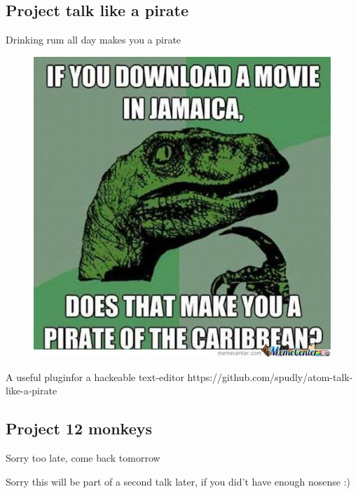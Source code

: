 \subsection{Project talk like a pirate}
\begin{frame}{Drinking rum all day makes you a pirate }{}
\begin{figure}[h]
\centering
\includegraphics[scale=0.40]{../images/pirate1.jpg}
\end{figure}
\end{frame}

\begin{frame}{A useful plugin}{for a hackeable text-editor}
https://github.com/spudly/atom-talk-like-a-pirate
\end{frame}

 
\subsection{Project 12 monkeys}
\begin{frame}{Sorry too late, come back tomorrow}{}

 Sorry this will be part of a second talk later, if you did't have enough nosense :)  

 
\end{frame} 



